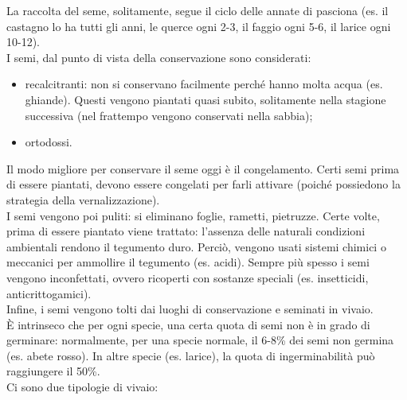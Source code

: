 La raccolta del seme, solitamente, segue il ciclo delle annate di pasciona (es. il castagno lo ha tutti gli anni, le querce ogni 2-3, il faggio ogni 5-6, il larice ogni 10-12).\\
I semi, dal punto di vista della conservazione sono considerati:
\begin{itemize}[nosep]
    \item recalcitranti: non si conservano facilmente perché hanno molta acqua (es. ghiande). Questi vengono piantati quasi subito, solitamente nella stagione successiva (nel frattempo vengono conservati nella sabbia);
    \item ortodossi.
\end{itemize}
Il modo migliore per conservare il seme oggi è il congelamento. Certi semi prima di essere piantati, devono essere congelati per farli attivare (poiché possiedono la strategia della vernalizzazione).\\
I semi vengono poi puliti: si eliminano foglie, rametti, pietruzze. Certe volte, prima di essere piantato viene trattato: l'assenza delle naturali condizioni ambientali rendono il tegumento duro. Perciò, vengono usati sistemi chimici o meccanici per ammollire il tegumento (es. acidi). Sempre più spesso i semi vengono inconfettati, ovvero ricoperti con sostanze speciali (es. insetticidi, anticrittogamici).\\
Infine, i semi vengono tolti dai luoghi di conservazione e seminati in vivaio.\\
È intrinseco che per ogni specie, una certa quota di semi non è in grado di germinare: normalmente, per una specie normale, il 6-8\% dei semi non germina (es. abete rosso). In altre specie (es. larice), la quota di ingerminabilità può raggiungere il 50\%.\\
Ci sono due tipologie di vivaio:
